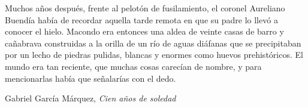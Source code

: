 \vspace*{5cm}
\epigraph{Muchos años después, frente al pelotón de fusilamiento, el coronel Aureliano Buendía hab\'ia de recordar aquella tarde remota en que su padre lo llevó a conocer el hielo. Macondo era entonces una aldea de veinte casas de barro y cañabrava construidas a la orilla de un r\'io de aguas di\'afanas que se precipitaban por un lecho de piedras pulidas, blancas y enormes como huevos prehist\'oricos. El mundo era tan reciente, que muchas cosas carecían de nombre, y para mencionarlas hab\'ia que señalarías con el dedo.}{Gabriel Garc\'ia M\'arquez, \textit{Cien a\~nos de soledad}}
\vfill
